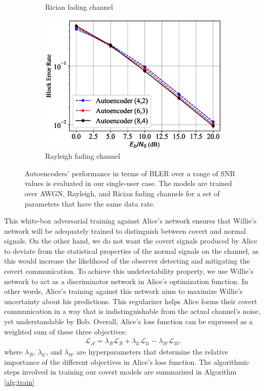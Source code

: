 \begin{figure}[!tp]
\begin{subfigure}{0.28\textwidth}
		\caption{Rician fading channel}	
	\end{subfigure}
	\begin{subfigure}{0.28\textwidth}
		\includegraphics[width=\linewidth]{figs/autoencoder_bler_rayleigh}
		\caption{Rayleigh fading channel}	
	\end{subfigure}
	\caption{Autoencoders' performance in terms of BLER over a range of SNR values is evaluated in our single-user case. The models are trained over AWGN, Rayleigh, and Rician fading channels for a set of parameters that have the same data rate.}
	\label{fig:autoencoder_bler}
\end{figure}

This white-box adversarial training against Alice's network ensures that Willie's network will be adequately trained to distinguish between covert and normal signals. On the other hand, we do not want the covert signals produced by Alice to deviate from the statistical properties of the normal signals on the channel, as this would increase the likelihood of the observer detecting and mitigating the covert communication. To achieve this undetectability property, we use Willie's network to act as a discriminator network in Alice's optimization function. In other words, Alice's training against this network aims to maximize Willie's uncertainty about his predictions. This regularizer helps Alice forms their covert communication in a way that is indistinguishable from the actual channel's noise, yet understandable by Bob. Overall, Alice's loss function can be expressed as a weighted sum of these three objectives:
\begin{equation}
	\begin{array}{l} \label{alice_loss}
	\mathcal{L}_{\mathcal{A}} = \lambda_{\mathcal{B}} \mathcal{L}_{\mathcal{B}} + \lambda_{\mathcal{U}} \mathcal{L}_{\mathcal{U}} - \lambda_{\mathcal{W}} \mathcal{L}_{\mathcal{W}}.
\end{array}
\end{equation}
where \(\lambda_{\mathcal{B}}\), \(\lambda_{\mathcal{U}}\), and \(\lambda_{\mathcal{W}}\) are hyperparameters that determine the relative importance of the different objectives in Alice's loss function. The algorithmic steps involved in training our covert models are summarized in Algorithm \ref{alg:train}


